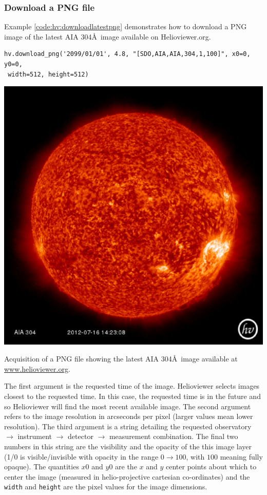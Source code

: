 \subsubsection{Download a PNG file}\label{sssec:hv:png}

Example \ref{code:hv:downloadlatestpng} demonstrates how to download a
PNG image of the latest AIA 304\AA\ image available on
Helioviewer.org.

\begin{listing}[H]
\begin{verbatim}
hv.download_png('2099/01/01', 4.8, "[SDO,AIA,AIA,304,1,100]", x0=0, y0=0,
 width=512, height=512)
\end{verbatim}
\includegraphics[width=0.8\columnwidth]{helioviewer_latest_aia_304}
\caption{Acquisition of a PNG file showing the latest AIA 304\AA\ image 
available at \url{www.helioviewer.org}.}
\label{code:hv:downloadlatestpng}
\end{listing}

The first argument is the requested time of the image.  Helioviewer
selects images closest to the requested time.  In this case, the
requested time is in the future and so Helioviewer will find the most
recent available image.  The second argument refers to the image
resolution in arcseconds per pixel (larger values mean lower
resolution).  The third argument is a string detailing the requested
observatory $\rightarrow$ instrument $\rightarrow$ detector
$\rightarrow$ measurement combination.  The final two numbers in this
string are the visibility and the opacity of the this image layer (1/0
is visible/invisible with opacity in the range $0\rightarrow100$, with
$100$ meaning fully opaque).  The quantities $x0$ and $y0$ are the $x$
and $y$ center points about which to center the image (measured in
helio-projective cartesian co-ordinates) and the \texttt{width} and
\texttt{height} are the pixel values for the image dimensions.

